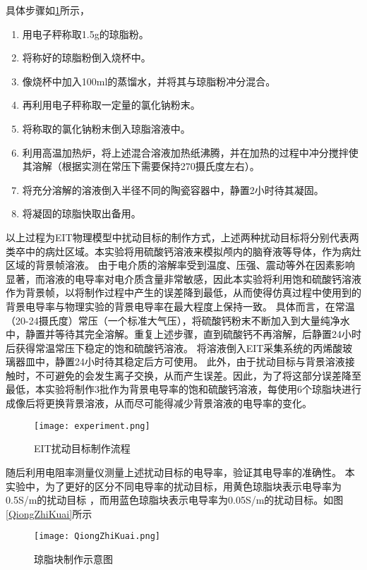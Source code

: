 具体步骤如\cref{figure:experiment}所示，
\begin{enumerate}
    \item 用电子秤称取1.5g的琼脂粉。
    \item 将称好的琼脂粉倒入烧杯中。
    \item 像烧杯中加入100ml的蒸馏水，并将其与琼脂粉冲分混合。
    \item 再利用电子秤称取一定量的氯化钠粉末。
    \item 将称取的氯化钠粉末倒入琼脂溶液中。
    \item 利用高温加热炉，将上述混合溶液加热纸沸腾，并在加热的过程中冲分搅拌使其溶解（根据实测在常压下需要保持270摄氏度左右）。
    \item 将充分溶解的溶液倒入半径不同的陶瓷容器中，静置2小时待其凝固。
    \item 将凝固的琼脂快取出备用。
\end{enumerate}

以上过程为EIT物理模型中扰动目标的制作方式，上述两种扰动目标将分别代表两类卒中的病灶区域。本实验将用硫酸钙溶液来模拟颅内的脑脊液等导体，作为病灶区域的背景帧溶液。
由于电介质的溶解率受到温度、压强、震动等外在因素影响显著，而溶液的电导率对电介质含量非常敏感，因此本实验将利用饱和硫酸钙溶液作为背景帧，以将制作过程中产生的误差降到最低，从而使得仿真过程中使用到的背景电导率与物理实验的背景电导率在最大程度上保持一致。
具体而言，在常温（20-24摄氏度）常压（一个标准大气压），将硫酸钙粉末不断加入到大量纯净水中，静置并等待其完全溶解。重复上述步骤，直到硫酸钙不再溶解，后静置24小时后获得常温常压下稳定的饱和硫酸钙溶液。
将溶液倒入EIT采集系统的丙烯酸玻璃器皿中，静置24小时待其稳定后方可使用。
此外，由于扰动目标与背景溶液接触时，不可避免的会发生离子交换，从而产生误差。因此，为了将这部分误差降至最低，本实验将制作3批作为背景电导率的饱和硫酸钙溶液，每使用6个琼脂块进行成像后将更换背景溶液，从而尽可能得减少背景溶液的电导率的变化。



\begin{figure}[H]
    \centering
    \texttt{[image: experiment.png]}
    \caption{EIT扰动目标制作流程}
    \label{figure:experiment}
\end{figure}

随后利用电阻率测量仪测量上述扰动目标的电导率，验证其电导率的准确性。
本实验中，为了更好的区分不同电导率的扰动目标，用黄色琼脂块表示电导率为0.5S/m的扰动目标
，而用蓝色琼脂块表示电导率为0.05S/m的扰动目标。如图\cref{QiongZhiKuai}所示

\begin{figure}[h]
    \centering

    \texttt{[image: QiongZhiKuai.png]}
    \caption{琼脂块制作示意图}
    \label{figure:QiongZhiKuai}
\end{figure}


